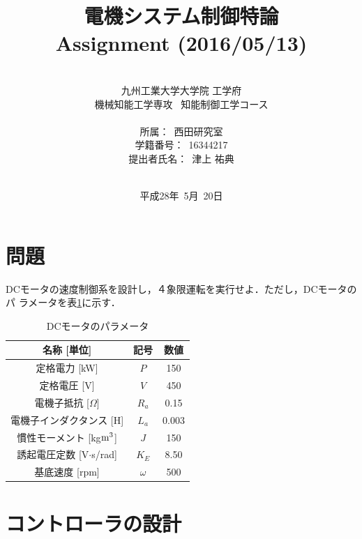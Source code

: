 \documentclass[a4paper,12pt]{jarticle}
\title{電機システム制御特論 \\
Assignment (2016/05/13)\\
}
\author{\vspace{40mm}\\
九州工業大学大学院 \hspace{0mm} 工学府\\
機械知能工学専攻\ \hspace{0mm} 知能制御工学コース \\
\vspace{5mm}\\
所属：\ 西田研究室\\
学籍番号：\ 16344217\\
提出者氏名：\ 津上 \hspace{0mm} 祐典\\\vspace{5mm}\\ }
\date{平成28年\ 5月\ 20日}
\begin{document}
\titlepage
\maketitle
\thispagestyle{empty}

\newpage

\section{問題}
DCモータの速度制御系を設計し，４象限運転を実行せよ．ただし，DCモータのパ
ラメータを表\ref{table:DC_dim}に示す．
%
\begin{table}[h]
 \centering
 \caption{DCモータのパラメータ}
 \label{table:DC_dim}
 \begin{tabular}{c|c|c} \hline
  名称 [単位]                    & 記号  & 数値\\\hline
  定格電力 [kW]                  &$P$    &150  \\\hline
  定格電圧 [V]                   &$V$    &450  \\\hline
  電機子抵抗 [$\Omega$]          &$R_a$  & 0.15 \\\hline
  電機子インダクタンス [H]        &$L_a$   &0.003\\\hline
  慣性モーメント [kg$\rm {m^3}$] &$J$     &150  \\\hline
  誘起電圧定数 [V$\cdot$s/rad]    &$K_E$   &8.50 \\\hline
  基底速度 [rpm]                &$\omega$&500  \\\hline
 \end{tabular}
\end{table}
%
\section{コントローラの設計}

\end{document}
